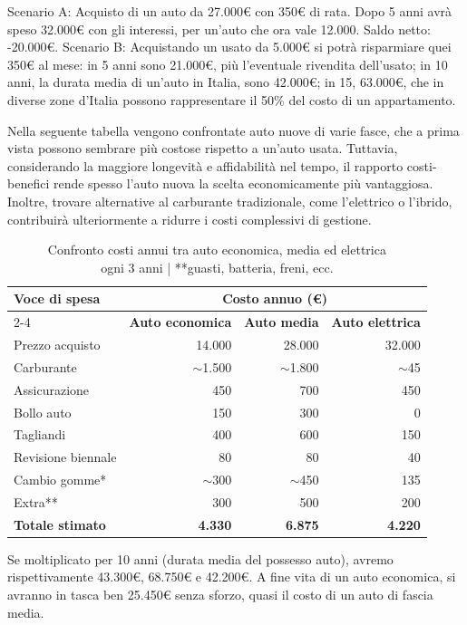 \documentclass[12pt]{book} %
\begin{document}
Scenario A: Acquisto di un auto da 27.000€ con 350€ di rata. Dopo 5 anni avrà speso 32.000€ con gli interessi, per un'auto che ora vale 12.000. Saldo netto: -20.000€.
Scenario B: Acquistando un usato da 5.000€ si potrà risparmiare quei 350€ al mese: in 5 anni sono 21.000€, più l'eventuale rivendita dell'usato; in 10 anni, la durata media di un'auto in Italia, sono 42.000€; in 15, 63.000€, che in diverse zone d'Italia possono rappresentare il 50\% del costo di un appartamento.

Nella seguente tabella vengono confrontate auto nuove di varie fasce, che a prima vista possono sembrare più costose rispetto a un’auto usata. Tuttavia, considerando la maggiore longevità e affidabilità nel tempo, il rapporto costi-benefici rende spesso l’auto nuova la scelta economicamente più vantaggiosa.
Inoltre, trovare alternative al carburante tradizionale, come l’elettrico o l’ibrido, contribuirà ulteriormente a ridurre i costi complessivi di gestione.

\begin{table}[H]
\centering
\caption{Confronto costi annui tra auto economica, media ed elettrica\\
\small *ogni 3 anni | **guasti, batteria, freni, ecc.}
\begin{tabular}{|l|r|r|r|}
\hline
\textbf{Voce di spesa} & \multicolumn{3}{c|}{\textbf{Costo annuo (€)}} \\
\cline{2-4}
 & \textbf{Auto economica} & \textbf{Auto media} & \textbf{Auto elettrica} \\
\hline
Prezzo acquisto & 14.000 & 28.000 & 32.000 \\
\hline
Carburante & $\sim$1.500 & $\sim$1.800 & $\sim$45 \\
\hline
Assicurazione & 450 & 700 & 450 \\
\hline
Bollo auto & 150 & 300 & 0 \\
\hline
Tagliandi & 400 & 600 & 150 \\
\hline
Revisione biennale & 80 & 80 & 40 \\
\hline
Cambio gomme* & $\sim$300 & $\sim$450 & 135 \\
\hline
Extra** & 300 & 500 & 200 \\
\hline
\hline
\textbf{Totale stimato} & \textbf{4.330} & \textbf{6.875} & \textbf{4.220} \\
\hline
\end{tabular}
\end{table}

Se moltiplicato per 10 anni (durata media del possesso auto), avremo rispettivamente 43.300€, 68.750€ e 42.200€. A fine vita di un auto economica, si avranno in tasca ben 25.450€ senza sforzo, quasi il costo di un auto di fascia media.
\end{document}
